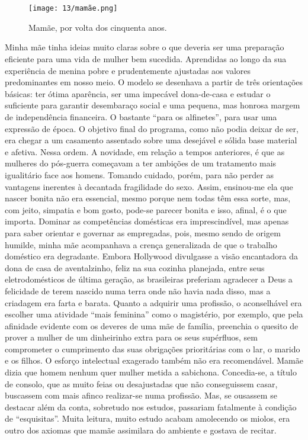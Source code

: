 \chapter{}

\begin{figure}
\centering
\texttt{[image: 13/mamãe.png]}
\caption{Mamãe, por volta dos cinquenta anos.}
\end{figure}

Minha mãe tinha ideias muito claras sobre o que deveria ser uma preparação eficiente para uma vida de mulher bem sucedida.
Aprendidas ao longo da sua experiência de menina pobre e prudentemente ajustadas aos valores predominantes em nosso meio.
O modelo se desenhava a partir de três orientações básicas: ter ótima aparência, ser uma impecável dona-de-casa e estudar o suficiente para garantir desembaraço social e uma pequena, mas honrosa margem de independência financeira.
O bastante ``para os alfinetes'', para usar uma expressão de época.
O objetivo final do programa, como não podia deixar de ser, era chegar a um casamento assentado sobre uma desejável e sólida base material e afetiva.
Nessa ordem.
A novidade, em relação a tempos anteriores, é que as mulheres do pós-guerra começavam a ter ambições de um tratamento mais igualitário face aos homens.
Tomando cuidado, porém, para não perder as vantagens inerentes à decantada fragilidade do sexo.
Assim, ensinou-me ela que nascer bonita não era essencial, mesmo porque nem todas têm essa sorte, mas, com jeito, simpatia e bom gosto, pode-se parecer bonita e isso, afinal, é o que importa.
Dominar as competências domésticas era imprescindível, mas apenas para saber orientar e governar as empregadas, pois, mesmo sendo de origem humilde, minha mãe acompanhava a crença generalizada de que o trabalho doméstico era degradante.
Embora Hollywood divulgasse a visão encantadora da dona de casa de aventalzinho, feliz na sua cozinha planejada, entre seus eletrodomésticos de última geração, as brasileiras preferiam agradecer a Deus a felicidade de terem nascido numa terra onde não havia nada disso, mas a criadagem era farta e barata.
Quanto a adquirir uma profissão, o aconselhável era escolher uma atividade “mais feminina” como o magistério, por exemplo, que pela afinidade evidente com os deveres de uma mãe de família, preenchia o quesito de prover a mulher de um dinheirinho extra para os seus supérfluos, sem comprometer o cumprimento das suas obrigações prioritárias com o lar, o marido e os filhos.
O esforço intelectual exagerado também não era recomendável.
Mamãe dizia que homem nenhum quer mulher metida a sabichona.
Concedia-se, a título de consolo, que as muito feias ou desajustadas que não conseguissem casar, buscassem com mais afinco realizar-se numa profissão.
Mas, se ousassem se destacar além da conta, sobretudo nos estudos, passariam fatalmente à condição de “esquisitas”.
Muita leitura, muito estudo acabam amolecendo os miolos, era outro dos axiomas que mamãe assimilara do ambiente e gostava de recitar.

